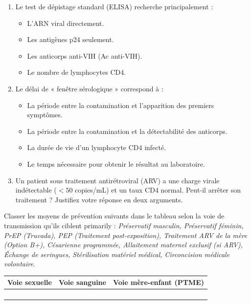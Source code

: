 \documentclass[11pt]{article}
\begin{document}
\begin{exercice}
\begin{enumerate}
\item Le test de dépistage standard (ELISA) recherche principalement :
\begin{itemize}
\item[$\square$] L'ARN viral directement.
\item[$\square$] Les antigènes p24 seulement.
\item[$\square$] Les anticorps anti-VIH (Ac anti-VIH).
\item[$\square$] Le nombre de lymphocytes CD4.
\end{itemize}
\item Le délai de « fenêtre sérologique » correspond à :
\begin{itemize}
\item[$\square$] La période entre la contamination et l'apparition des premiers symptômes.
\item[$\square$] La période entre la contamination et la détectabilité des anticorps.
\item[$\square$] La durée de vie d'un lymphocyte CD4 infecté.
\item[$\square$] Le temps nécessaire pour obtenir le résultat au laboratoire.
\end{itemize}
\item Un patient sous traitement antirétroviral (ARV) a une charge virale indétectable ($<50$ copies/mL) et un taux CD4 normal. Peut-il arrêter son traitement ? Justifiez votre réponse en deux arguments.
\end{enumerate}
\end{exercice}

\begin{exercice}
Classer les moyens de prévention suivants dans le tableau selon la voie de transmission qu'ils ciblent primarily : \textit{Préservatif masculin, Préservatif féminin, PrEP (Truvada), PEP (Traitement post-exposition), Traitement ARV de la mère (Option B+), Césarienne programmée, Allaitement maternel exclusif (si ARV), Échange de seringues, Stérilisation matériel médical, Circoncision médicale volontaire}.

\begin{tabular}{|p{5cm}|p{5cm}|p{5cm}|}
\hline
\textbf{Voie sexuelle} & \textbf{Voie sanguine} & \textbf{Voie mère-enfant (PTME)} \\
\hline
\dotfill & \dotfill & \dotfill \\
\dotfill & \dotfill & \dotfill \\
\dotfill & \dotfill & \dotfill \\
\dotfill & \dotfill & \dotfill \\
\hline
\end{tabular}
\end{exercice}
\end{document}
